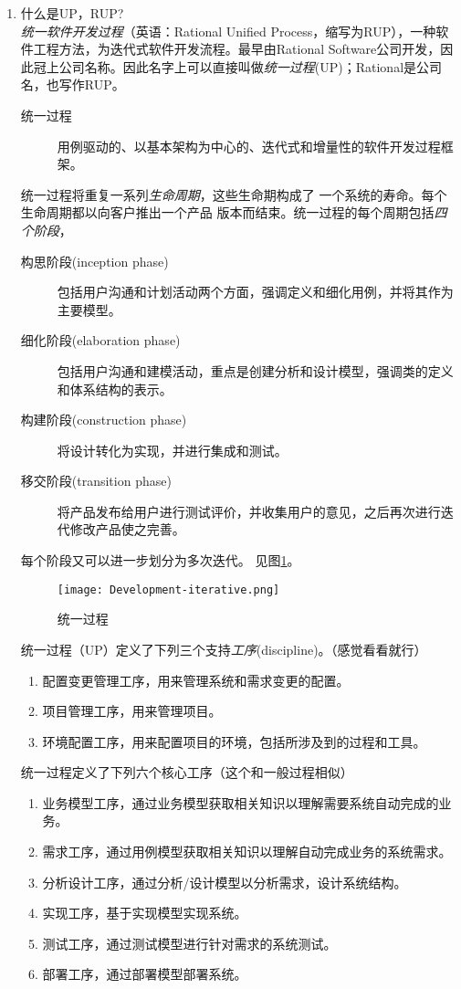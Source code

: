 \documentclass[14pt, letterpaper, UTF8, fontset=windowsnew, heading=true]{article}
\begin{document}
\begin{enumerate}

	\item 什么是UP，RUP? \\
	\emph{统一软件开发过程}（英语：Rational Unified Process，缩写为RUP），一种软件工程方法，为迭代式软件开发流程。最早由Rational Software公司开发，因此冠上公司名称。因此名字上可以直接叫做\emph{统一过程}(UP)；Rational是公司名，也写作RUP。
	\begin{description}
		\item[统一过程] 用例驱动的、以基本架构为中心的、迭代式和增量性的软件开发过程框架。
	\end{description}
	统一过程将重复一系列\emph{生命周期}，这些生命期构成了
	一个系统的寿命。每个生命周期都以向客户推出一个产品
	版本而结束。统一过程的每个周期包括\emph{四个阶段}，
	\begin{description}
		\item[构思阶段(inception phase)] 包括用户沟通和计划活动两个方面，强调定义和细化用例，并将其作为主要模型。
		\item[细化阶段(elaboration phase)] 包括用户沟通和建模活动，重点是创建分析和设计模型，强调类的定义和体系结构的表示。
		\item[构建阶段(construction phase)] 将设计转化为实现，并进行集成和测试。
		\item[移交阶段(transition phase)] 将产品发布给用户进行测试评价，并收集用户的意见，之后再次进行迭代修改产品使之完善。
	\end{description}
	每个阶段又可以进一步划分为多次迭代。
	见图\ref{fig:developmentiterative}。\\
	\begin{figure}[h]
		\centering
		\texttt{[image: Development-iterative.png]}
		\caption{统一过程}
		\label{fig:developmentiterative}
	\end{figure}
	统一过程（UP）定义了下列三个支持\emph{工序}(discipline)。（感觉看看就行）
	\begin{enumerate}
		\item 配置变更管理工序，用来管理系统和需求变更的配置。
		\item 项目管理工序，用来管理项目。
		\item 环境配置工序，用来配置项目的环境，包括所涉及到的过程和工具。
	\end{enumerate}
	统一过程定义了下列六个核心工序（这个和一般过程相似）
	\begin{enumerate}
		\item 业务模型工序，通过业务模型获取相关知识以理解需要系统自动完成的业务。
		\item 需求工序，通过用例模型获取相关知识以理解自动完成业务的系统需求。
		\item 分析设计工序，通过分析/设计模型以分析需求，设计系统结构。
		\item 实现工序，基于实现模型实现系统。
		\item 测试工序，通过测试模型进行针对需求的系统测试。
		\item 部署工序，通过部署模型部署系统。
	\end{enumerate}


\end{enumerate}
\end{document}
